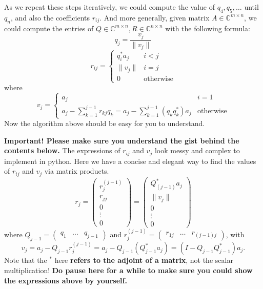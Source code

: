 \noindent As we repeat these steps iteratively, we could compute the value of $q_4, q_5, \ldots$ until $q_n$, and also the coefficients \(r_{ij}\). And more generally, given matrix \(A \in \mathbb{C}^{m \times n}\), we could compute the entries of \(Q \in \mathbb{C}^{m \times  n}, R \in \mathbb{C}^{n \times  n}\) with the following formula:
\[
  q_j = \frac{v_{j}}{\|v_{j}\|}
\]
\[
  r_{ij} = \left\{
    \begin{array}{ll}
    q_{i}^{*}a_{j} & i < j\\
    \|v_{j}\| & i = j\\
    0 & \text{otherwise}
    \end{array}
  \right.
  \]
  where
  \[
    v_{j} = \left\{
      \begin{array}{ll}
        a_{j} & i = 1\\
        a_{j} - \sum_{k=1}^{j - 1} r_{kj}q_{k} = a_{j} - \sum_{k=1}^{j - 1} (q_{k}q_{k}^{*})a_{j} & \text{otherwise}
      \end{array}
      \right.
      \]
      Now the algorithm above should be easy for you to understand.

\noindent \textbf{Important! Please make sure you understand the gist behind the contents below.}  The expressions of \(r_{ij}\) and \(v_j\) look messy and complex to implement in python. Here we have a concise and elegant way to find the values of \(r_{ij}\) and \(v_j\) via matrix products.
\[
  r_j = \begin{pmatrix} r_j^{(j - 1)} \\ r_{jj} \\ 0 \\ \vdots \\ 0\end{pmatrix} = \begin{pmatrix} Q_{(j - 1)}^{*}a_j \\ \|v_j\| \\ 0 \\ \vdots \\ 0\end{pmatrix}
  \]
  where \(Q_{j - 1} = \begin{pmatrix} 
  q_1 & \dots & q_{j - 1} 
\end{pmatrix} \) and \(r_j^{(j - 1)} = \begin{pmatrix} 
  r_{1j} & \dots & r_{(j-1)j}
\end{pmatrix} \), with   
\[
  v_j = a_j - Q_{j - 1}r_j^{(j - 1)} = a_j - Q_{j - 1}(Q_{j - 1}^{*}a_j) = (I - Q_{j - 1}Q_{j - 1}^{*})a_j
.\]
Note that the \(^{*}\) here \textbf{refers to the adjoint of a matrix}, not the scalar multiplication!
\textbf{Do pause here for a while to make sure you could show the expressions above by yourself.} \medskip

